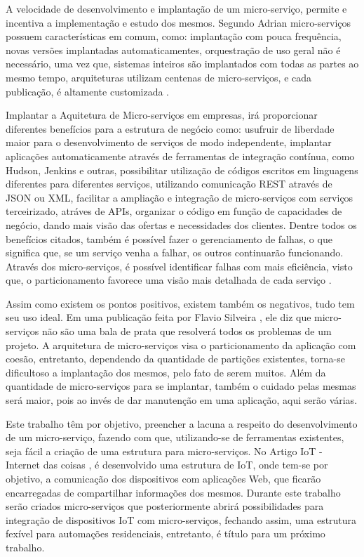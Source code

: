 \documentclass[journal]{IEEEtran}
\begin{document}
A velocidade de desenvolvimento e implantação de um micro-serviço, permite e incentiva a implementação e estudo dos mesmos. Segundo Adrian micro-serviços possuem características em comum, como: implantação com pouca frequência, novas versões implantadas automaticamentes, orquestração de uso geral não é necessário, uma vez que, sistemas inteiros são implantados com todas as partes ao mesmo tempo, arquiteturas utilizam centenas de micro-serviços, e cada publicação, é altamente customizada \cite{JanStenberg}.

Implantar a Aquitetura de Micro-serviços em empresas, irá proporcionar diferentes benefícios para a estrutura de negócio como: usufruir de liberdade maior para o desenvolvimento de serviços de modo independente, implantar aplicações automaticamente através de ferramentas de integração contínua, como Hudson, Jenkins e outras, possibilitar utilização de códigos escritos em linguagens diferentes para diferentes serviços, utilizando comunicação REST através de JSON ou XML, facilitar a ampliação e integração de micro-serviços com serviços terceirizado, atráves de APIs, organizar o código em função de capacidades de negócio, dando mais visão das ofertas e necessidades dos clientes. Dentre todos os benefícios citados, também é possível fazer o gerenciamento de falhas, o que significa que, se um serviço venha a falhar, os outros continuarão funcionando. Através dos micro-serviços, é possível identificar falhas com mais eficiência, visto que, o particionamento favorece uma visão mais detalhada de cada serviço \cite{RicardoPeloi}.

Assim como existem os pontos positivos, existem também os negativos, tudo tem seu uso ideal. Em uma publicação feita por Flavio Silveira \cite{flaviosilveira}, ele diz que micro-serviços não são uma bala de prata que resolverá todos os problemas de um projeto. A arquitetura de micro-serviços visa o particionamento da aplicação com coesão, entretanto, dependendo da quantidade de partições existentes, torna-se dificultoso a implantação dos mesmos, pelo fato de serem muitos. Além da quantidade de micro-serviços para se implantar, também o cuidado pelas mesmas será maior, pois ao invés de dar manutenção em uma aplicação, aqui serão várias.

Este trabalho têm por objetivo, preencher a lacuna a respeito do desenvolvimento de um micro-serviço, fazendo com que, utilizando-se de ferramentas existentes, seja fácil a criação de uma estrutura para micro-serviços. No Artigo IoT - Internet das coisas \cite{willianmunif}, é desenvolvido uma estrutura de IoT, onde tem-se por objetivo, a comunicação dos dispositivos com aplicações Web, que ficarão encarregadas de compartilhar informações dos mesmos. Durante este trabalho serão criados micro-serviços que posteriormente abrirá possibilidades para integração de dispositivos IoT com micro-serviços, fechando assim, uma estrutura fexível para automações residenciais, entretanto, é título para um próximo trabalho.
\end{document}
